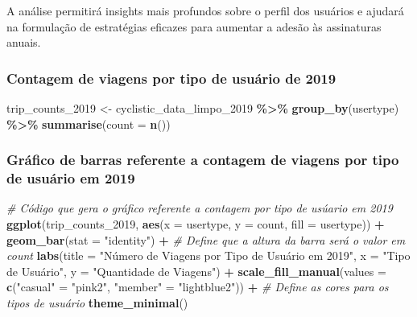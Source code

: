 \documentclass[
]{article}
\newenvironment{Shaded}{\begin{snugshade}}{\end{snugshade}}
\newcommand{\AttributeTok}[1]{\textcolor[rgb]{0.13,0.29,0.53}{#1}}
\newcommand{\CommentTok}[1]{\textcolor[rgb]{0.56,0.35,0.01}{\textit{#1}}}
\newcommand{\FunctionTok}[1]{\textcolor[rgb]{0.13,0.29,0.53}{\textbf{#1}}}
\newcommand{\NormalTok}[1]{#1}
\newcommand{\OtherTok}[1]{\textcolor[rgb]{0.56,0.35,0.01}{#1}}
\newcommand{\SpecialCharTok}[1]{\textcolor[rgb]{0.81,0.36,0.00}{\textbf{#1}}}
\newcommand{\StringTok}[1]{\textcolor[rgb]{0.31,0.60,0.02}{#1}}
\begin{document}
A análise permitirá insights mais profundos sobre o perfil dos usuários
e ajudará na formulação de estratégias eficazes para aumentar a adesão
às assinaturas anuais.

\subsubsection{Contagem de viagens por tipo de usuário de
2019}\label{contagem-de-viagens-por-tipo-de-usuuxe1rio-de-2019}

\begin{Shaded}
\begin{Highlighting}[]
\NormalTok{trip\_counts\_2019 }\OtherTok{\textless{}{-}}\NormalTok{ cyclistic\_data\_limpo\_2019 }\SpecialCharTok{\%\textgreater{}\%}
  \FunctionTok{group\_by}\NormalTok{(usertype) }\SpecialCharTok{\%\textgreater{}\%}
  \FunctionTok{summarise}\NormalTok{(}\AttributeTok{count =} \FunctionTok{n}\NormalTok{())}
\end{Highlighting}
\end{Shaded}

\subsubsection{Gráfico de barras referente a contagem de viagens por
tipo de usuário em
2019}\label{gruxe1fico-de-barras-referente-a-contagem-de-viagens-por-tipo-de-usuuxe1rio-em-2019}

\begin{Shaded}
\begin{Highlighting}[]
\CommentTok{\# Código que gera o gráfico referente a contagem por tipo de usúario em 2019}
\FunctionTok{ggplot}\NormalTok{(trip\_counts\_2019, }\FunctionTok{aes}\NormalTok{(}\AttributeTok{x =}\NormalTok{ usertype, }\AttributeTok{y =}\NormalTok{ count, }\AttributeTok{fill =}\NormalTok{ usertype)) }\SpecialCharTok{+}
  \FunctionTok{geom\_bar}\NormalTok{(}\AttributeTok{stat =} \StringTok{"identity"}\NormalTok{) }\SpecialCharTok{+}  \CommentTok{\# Define que a altura da barra será o valor em \textquotesingle{}count\textquotesingle{}}
  \FunctionTok{labs}\NormalTok{(}\AttributeTok{title =} \StringTok{"Número de Viagens por Tipo de Usuário em 2019"}\NormalTok{, }
       \AttributeTok{x =} \StringTok{"Tipo de Usuário"}\NormalTok{, }\AttributeTok{y =} \StringTok{"Quantidade de Viagens"}\NormalTok{) }\SpecialCharTok{+}
  \FunctionTok{scale\_fill\_manual}\NormalTok{(}\AttributeTok{values =} \FunctionTok{c}\NormalTok{(}\StringTok{"casual"} \OtherTok{=} \StringTok{"pink2"}\NormalTok{, }\StringTok{"member"} \OtherTok{=} \StringTok{"lightblue2"}\NormalTok{)) }\SpecialCharTok{+}  \CommentTok{\# Define as cores para os tipos de usuário}
  \FunctionTok{theme\_minimal}\NormalTok{()}
\end{Highlighting}
\end{Shaded}
\end{document}
